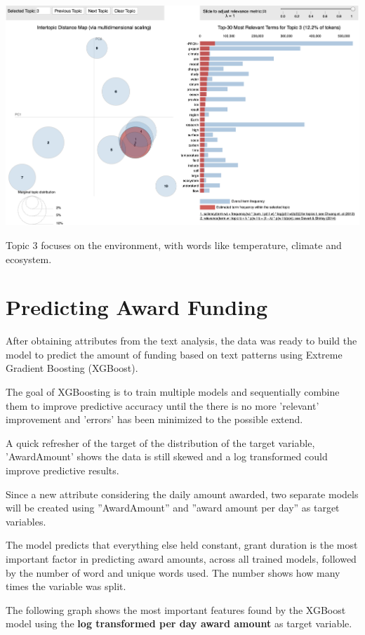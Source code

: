 \documentclass[11pt, oneside]{article}   	%
\begin{document}
  \includegraphics[width=\textwidth]{ldaVisualizationTopic3}
  
  Topic 3 focuses on the environment, with words like temperature, climate and ecosystem.
 
 \section{Predicting Award Funding} 
 
After obtaining attributes from the text analysis, the data was ready to build the model to predict the amount of funding based on text patterns using Extreme Gradient Boosting (XGBoost).

The goal of XGBoosting is to train multiple models and sequentially combine them to improve predictive accuracy until the there is no more 'relevant' improvement and 'errors' has been minimized to the possible extend.

A quick refresher of the target of the distribution of the target variable, 'AwardAmount' shows the data is still skewed and a log transformed could improve predictive results.

Since a new attribute considering the daily amount awarded, two separate models will be created using ''AwardAmount'' and ''award amount per day'' as target variables.

The model predicts that everything else held constant, grant duration is the most important factor in predicting award amounts, across all trained models, followed by the number of word and unique words used. The number shows how many times the variable was split.

The following graph shows the most important features found by the XGBoost model using the \textbf{ log transformed per day award amount} as target variable. 
\end{document}
